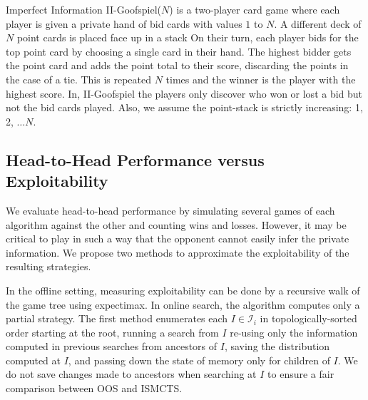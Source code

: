 \documentclass[letterpaper]{article}
\newcommand{\cI}{\mathcal{I}}
\newcommand{\defword}[1]{\textbf{\boldmath{#1}}}
\newcounter{mlNoteCounter}
\newcommand{\mlnote}[1]{{\scriptsize \color{darkgreen} $\blacksquare$ \refstepcounter{mlNoteCounter}\textsf{[ML]$_{\arabic{mlNoteCounter}}$:{#1}}}}
\begin{document}
Imperfect Information II-Goofspiel($N$) is a two-player card game where each player is
given a private hand of bid cards with values $1$ to $N$. A different
deck of $N$ point cards is placed face up in a stack 
On their turn, each player bids for the top point card by 
choosing a single card in their hand. 
The highest bidder gets the point card and adds the point total to their score, discarding
the points in the case of a tie. 
This is repeated $N$ times and the winner is the player with the highest score.
In, II-Goofspiel the players only discover who won or lost a bid but not the bid cards played.
Also, we assume the point-stack is strictly increasing: 1, 2, $\ldots N$.


\subsection{Head-to-Head Performance versus Exploitability} 


We evaluate head-to-head performance by simulating several games of each algorithm against the other
and counting wins and losses. 
However, %
it may be critical to play in such a way that the opponent cannot easily infer the private information.  
We propose two methods to approximate the exploitability of the resulting strategies. 

In the offline setting, measuring exploitability can be done by a recursive walk of the game 
tree using expectimax. In online search, the algorithm computes only 
a partial strategy. 
The first \defword{full stitching} method 
enumerates each $I \in \cI_i$ in topologically-sorted order starting at the root, 
running a search from $I$ re-using only the information computed in previous searches from ancestors of $I$, saving the 
distribution computed at $I$, and passing down the state of memory only for children of $I$. 
We do not save changes made to ancestors when searching at $I$ to ensure 
a fair comparison between OOS and ISMCTS. 
\end{document}
